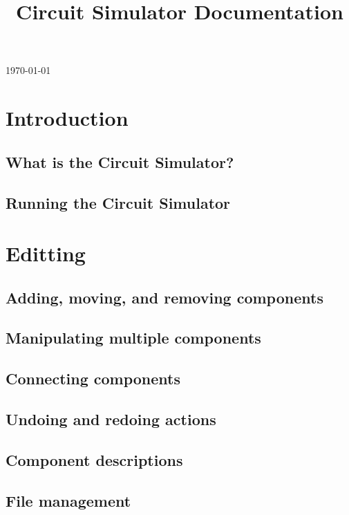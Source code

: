 \documentclass[12pt]{amsart}
\title{Circuit Simulator Documentation}
\begin{document}
\today

\maketitle

\tableofcontents

\section{Introduction}

\subsection{What is the Circuit Simulator?}

\subsection{Running the Circuit Simulator}

\section{Editting}

\subsection{Adding, moving, and removing components}

\subsection{Manipulating multiple components}

\subsection{Connecting components}

\subsection{Undoing and redoing actions}

\subsection{Component descriptions}

\subsection{File management}
\end{document}

